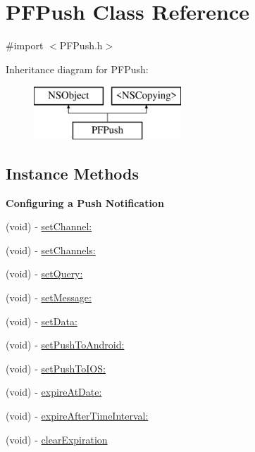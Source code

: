 \hypertarget{interface_p_f_push}{}\section{P\+F\+Push Class Reference}
\label{interface_p_f_push}


{\ttfamily \#import $<$P\+F\+Push.\+h$>$}

Inheritance diagram for P\+F\+Push\+:\begin{figure}[H]
\begin{center}
\leavevmode
\includegraphics[height=2.000000cm]{interface_p_f_push}
\end{center}
\end{figure}
\subsection*{Instance Methods}
\begin{Indent}{\bf Configuring a Push Notification}\par
{\em 

 

 }\begin{DoxyCompactItemize}
\item 
(void) -\/ \hyperlink{interface_p_f_push_adff864ad664a6ef73025134d25dc635e}{set\+Channel\+:}
\item 
(void) -\/ \hyperlink{interface_p_f_push_a7c330cf0ac5be80f67baced4fcc37e17}{set\+Channels\+:}
\item 
(void) -\/ \hyperlink{interface_p_f_push_a21164e760882e2975d66550bb52db78c}{set\+Query\+:}
\item 
(void) -\/ \hyperlink{interface_p_f_push_abcbcb4efb1e43155e5b13ca65763050c}{set\+Message\+:}
\item 
(void) -\/ \hyperlink{interface_p_f_push_a9c08085efcc69bb087c5405c674ef3d4}{set\+Data\+:}
\item 
(void) -\/ \hyperlink{interface_p_f_push_abb3c035bafca04776859b5162ebb2971}{set\+Push\+To\+Android\+:}
\item 
(void) -\/ \hyperlink{interface_p_f_push_a909c5f0f00ce3975508b0717f9d346f7}{set\+Push\+To\+I\+O\+S\+:}
\item 
(void) -\/ \hyperlink{interface_p_f_push_a101205e8c3c553b1bc83f1acbbf56241}{expire\+At\+Date\+:}
\item 
(void) -\/ \hyperlink{interface_p_f_push_a3c188faed1a18b012997aa6f96a46ae6}{expire\+After\+Time\+Interval\+:}
\item 
(void) -\/ \hyperlink{interface_p_f_push_a349b1b43b499be265940ff64252d10fa}{clear\+Expiration}
\end{DoxyCompactItemize}
\end{Indent}

